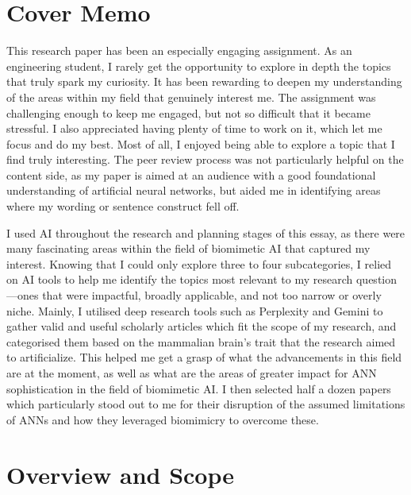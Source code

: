 \documentclass[
10pt, %
a4paper, %
oneside, %
headinclude,footinclude, %
BCOR5mm, %
]{scrartcl}
\begin{document}
\section*{Cover Memo}

This research paper has been an especially engaging assignment. As an engineering student, I rarely get the opportunity to explore in depth the topics that truly spark my curiosity. It has been rewarding to deepen my understanding of the areas within my field that genuinely interest me. The assignment was challenging enough to keep me engaged, but not so difficult that it became stressful. I also appreciated having plenty of time to work on it, which let me focus and do my best. Most of all, I enjoyed being able to explore a topic that I find truly interesting. The peer review process was not particularly helpful on the content side, as my paper is aimed at an audience with a good foundational understanding of artificial neural networks, but aided me in identifying areas where my wording or sentence construct fell off. 

I used AI throughout the research and planning stages of this essay, as there were many fascinating areas within the field of biomimetic AI that captured my interest. Knowing that I could only explore three to four subcategories, I relied on AI tools to help me identify the topics most relevant to my research question—ones that were impactful, broadly applicable, and not too narrow or overly niche. Mainly, I utilised deep research tools such as Perplexity and Gemini to gather valid and useful scholarly articles which fit the scope of my research, and categorised them based on the mammalian brain’s trait that the research aimed to artificialize. This helped me get a grasp of what the advancements in this field are at the moment, as well as what are the areas of greater impact for ANN sophistication in the field of biomimetic AI. I then selected half a dozen papers which particularly stood out to me for their disruption of the assumed limitations of ANNs and how they leveraged biomimicry to overcome these.

\section{Overview and Scope}
\end{document}
